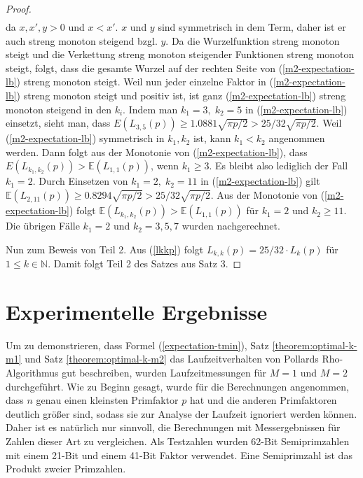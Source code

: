 \documentclass[a4paper, 10pt, ngerman]{article}
\newcommand{\E}{\mathbb{E}}
\newcommand{\N}{\mathbb{N}}
\begin{document}
\begin{proof}
\begin{align*}
        \end{align*}
        da $x, x', y > 0$ und $x < x'$. $x$ und $y$ sind symmetrisch in dem Term, daher ist er auch streng monoton steigend bzgl. $y$. Da die Wurzelfunktion streng monoton steigt und die Verkettung streng monoton steigender Funktionen streng monoton steigt, folgt, dass die gesamte Wurzel auf der rechten Seite von (\ref{m2-expectation-lb}) streng monoton steigt. Weil nun jeder einzelne Faktor in (\ref{m2-expectation-lb}) streng monoton steigt und positiv ist, ist ganz (\ref{m2-expectation-lb}) streng monoton steigend in den $k_i$. Indem man $k_1 = 3,\; k_2 = 5$ in (\ref{m2-expectation-lb}) einsetzt, sieht man, dass $E(L_{3, 5}(p)) \ge 1.0881 \sqrt{\pi p /2}  > 25 / 32 \sqrt{\pi p / 2}$. Weil (\ref{m2-expectation-lb}) symmetrisch in $k_1, k_2$ ist, kann $k_1 < k_2$ angenommen werden. Dann folgt aus der Monotonie von (\ref{m2-expectation-lb}), dass $E(L_{k_1, k_2}(p)) > \E(L_{1, 1}(p))$, wenn $k_1 \ge 3$. Es bleibt also lediglich der Fall $k_1 = 2$. Durch Einsetzen von $k_1 = 2, \; k_2 = 11$ in (\ref{m2-expectation-lb}) gilt $\E(L_{2, 11}(p)) \ge 0.8294 \sqrt{\pi p / 2} > 25 / 32 \sqrt{\pi p / 2}$. Aus der Monotonie von (\ref{m2-expectation-lb}) folgt $\E(L_{k_1, k_2}(p)) > \E(L_{1, 1}(p))$ für $k_1 = 2$ und $k_2 \ge 11$. Die übrigen Fälle $k_1 = 2$ und $k_2 = 3, 5, 7$ wurden nachgerechnet.

        Nun zum Beweis von Teil 2. Aus (\ref{lkkp}) folgt $L_{k, k}(p) = 25 / 32 \cdot L_{k}(p)$ für $1 \le k \in \N$. Damit folgt Teil 2 des Satzes aus Satz 3.
    \end{proof}

    \section{Experimentelle Ergebnisse}

    Um zu demonstrieren, dass Formel (\ref{expectation-tmin}), Satz \ref{theorem:optimal-k-m1} und Satz \ref{theorem:optimal-k-m2} das Laufzeitverhalten von Pollards Rho-Algorithmus gut beschreiben, wurden Laufzeitmessungen für $M = 1$ und $M = 2$ durchgeführt. Wie zu Beginn gesagt, wurde für die Berechnungen angenommen, dass $n$ genau einen kleinsten Primfaktor $p$ hat und die anderen Primfaktoren deutlich größer sind, sodass sie zur Analyse der Laufzeit ignoriert werden können. Daher ist es natürlich nur sinnvoll, die Berechnungen mit Messergebnissen für Zahlen dieser Art zu vergleichen. Als Testzahlen wurden 62-Bit Semiprimzahlen mit einem 21-Bit und einem 41-Bit Faktor verwendet. Eine Semiprimzahl ist das Produkt zweier Primzahlen.
\end{document}
